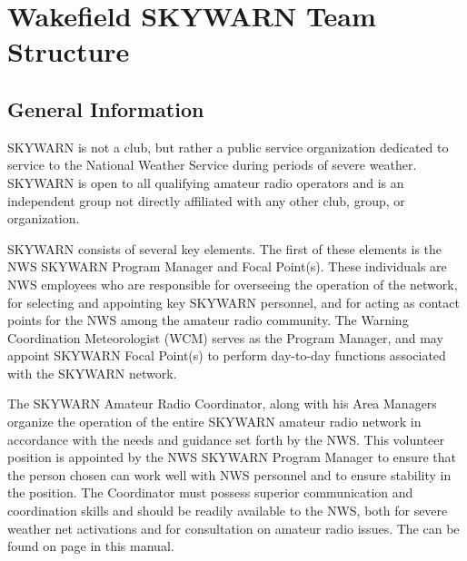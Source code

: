 \documentclass[pdflatex,letterpaper,twoside,12pt]{book}
\begin{document}

\chapter{Wakefield SKYWARN Team Structure}


\section{General Information}

SKYWARN is not a club, but rather a public service organization dedicated to service to the National Weather Service during periods of severe weather. SKYWARN is open to all qualifying amateur radio operators and is an independent group not directly affiliated with any other club, group, or organization.

SKYWARN consists of several key elements.  The first of these elements is the NWS SKYWARN Program Manager and Focal Point(s).  These individuals are NWS employees who are responsible for overseeing the operation of the network, for selecting and appointing key SKYWARN personnel, and for acting as contact points for the NWS among the amateur radio community.  The Warning Coordination Meteorologist (WCM) serves as the Program Manager, and may appoint SKYWARN Focal Point(s) to perform day-to-day functions associated with the SKYWARN network.

The SKYWARN Amateur Radio Coordinator, along with his Area Managers organize the operation of the entire SKYWARN amateur radio network in accordance with the needs and guidance set forth by the NWS.  This volunteer position is appointed by the NWS SKYWARN Program Manager to ensure that the person chosen can work well with NWS personnel and to ensure stability in the position.  The Coordinator must possess superior communication and coordination skills and should be readily available to the NWS, both for severe weather net activations and for consultation on amateur radio issues.  The  can be found on page \pageref{arc-jobdesc} in this manual.
\end{document}
